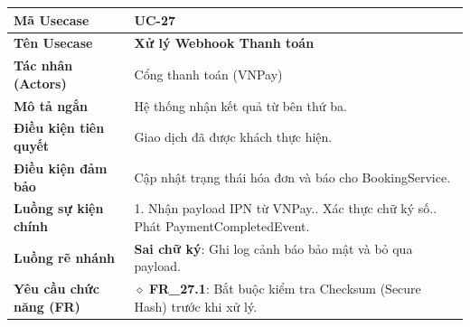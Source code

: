 \begin{table}[H]
\renewcommand{\arraystretch}{1.3}
\centering
\begin{tabularx}{\textwidth}{|p{4.5cm}|X|}
\hline
\cellcolor{gray!15}\bfseries Mã Usecase & \textbf{UC-27} \\ \hline
\cellcolor{gray!15}\bfseries Tên Usecase & \textbf{Xử lý Webhook Thanh toán} \\ \hline
\cellcolor{gray!15}\bfseries Tác nhân (Actors) & Cổng thanh toán (VNPay) \\ \hline
\cellcolor{gray!15}\bfseries Mô tả ngắn & Hệ thống nhận kết quả từ bên thứ ba. \\ \hline
\cellcolor{gray!15}\bfseries Điều kiện tiên quyết & Giao dịch đã được khách thực hiện. \\ \hline
\cellcolor{gray!15}\bfseries Điều kiện đảm bảo & Cập nhật trạng thái hóa đơn và báo cho BookingService. \\ \hline
\cellcolor{gray!15}\bfseries Luồng sự kiện chính & 1. Nhận payload IPN từ VNPay.\newline 2. Xác thực chữ ký số.\newline 3. Phát PaymentCompletedEvent. \\ \hline
\cellcolor{gray!15}\bfseries Luồng rẽ nhánh & \textbf{Sai chữ ký}: Ghi log cảnh báo bảo mật và bỏ qua payload. \\ \hline
\cellcolor{gray!15}\bfseries Yêu cầu chức năng (FR) & $\diamond$ \textbf{FR\_27.1}: Bắt buộc kiểm tra Checksum (Secure Hash) trước khi xử lý. \\ \hline
\end{tabularx}
\end{table}

